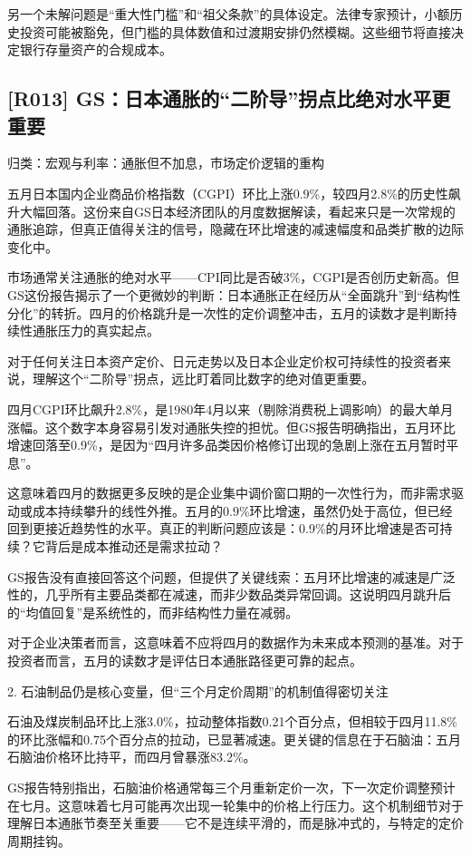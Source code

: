\documentclass[11pt]{ctexart}
\begin{document}
另一个未解问题是“重大性门槛”和“祖父条款”的具体设定。法律专家预计，小额历史投资可能被豁免，但门槛的具体数值和过渡期安排仍然模糊。这些细节将直接决定银行存量资产的合规成本。

\subsection{[R013] GS：日本通胀的“二阶导”拐点比绝对水平更重要}
{\small\color{refgray}归类：宏观与利率：通胀但不加息，市场定价逻辑的重构}

五月日本国内企业商品价格指数（CGPI）环比上涨0.9\%，较四月2.8\%的历史性飙升大幅回落。这份来自GS日本经济团队的月度数据解读，看起来只是一次常规的通胀追踪，但真正值得关注的信号，隐藏在环比增速的减速幅度和品类扩散的边际变化中。

市场通常关注通胀的绝对水平——CPI同比是否破3\%，CGPI是否创历史新高。但GS这份报告揭示了一个更微妙的判断：日本通胀正在经历从“全面跳升”到“结构性分化”的转折。四月的价格跳升是一次性的定价调整冲击，五月的读数才是判断持续性通胀压力的真实起点。

对于任何关注日本资产定价、日元走势以及日本企业定价权可持续性的投资者来说，理解这个“二阶导”拐点，远比盯着同比数字的绝对值更重要。

四月CGPI环比飙升2.8\%，是1980年4月以来（剔除消费税上调影响）的最大单月涨幅。这个数字本身容易引发对通胀失控的担忧。但GS报告明确指出，五月环比增速回落至0.9\%，是因为“四月许多品类因价格修订出现的急剧上涨在五月暂时平息”。

这意味着四月的数据更多反映的是企业集中调价窗口期的一次性行为，而非需求驱动或成本持续攀升的线性外推。五月的0.9\%环比增速，虽然仍处于高位，但已经回到更接近趋势性的水平。真正的判断问题应该是：0.9\%的月环比增速是否可持续？它背后是成本推动还是需求拉动？

GS报告没有直接回答这个问题，但提供了关键线索：五月环比增速的减速是广泛性的，几乎所有主要品类都在减速，而非少数品类异常回调。这说明四月跳升后的“均值回复”是系统性的，而非结构性力量在减弱。

对于企业决策者而言，这意味着不应将四月的数据作为未来成本预测的基准。对于投资者而言，五月的读数才是评估日本通胀路径更可靠的起点。

2. 石油制品仍是核心变量，但“三个月定价周期”的机制值得密切关注

石油及煤炭制品环比上涨3.0\%，拉动整体指数0.21个百分点，但相较于四月11.8\%的环比涨幅和0.75个百分点的拉动，已显著减速。更关键的信息在于石脑油：五月石脑油价格环比持平，而四月曾暴涨83.2\%。

GS报告特别指出，石脑油价格通常每三个月重新定价一次，下一次定价调整预计在七月。这意味着七月可能再次出现一轮集中的价格上行压力。这个机制细节对于理解日本通胀节奏至关重要——它不是连续平滑的，而是脉冲式的，与特定的定价周期挂钩。
\end{document}
